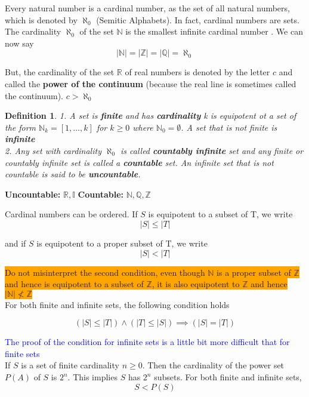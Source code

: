 \documentclass[12pt]{article}
\newcommand{\mybox}[2][black]{\colorbox{#1}{#2}}
\newcommand{\RR}{\mathbb{R}}
\newcommand{\NN}{\mathbb{N}}
\newcommand{\ZZ}{\mathbb{Z}}
\newcommand{\QQ}{\mathbb{Q}}
\newtheorem{definition}{Definition}
\begin{document}
Every natural number is a cardinal number, as the set of all natural numbers, which is denoted by $\aleph_0$ (Semitic Alphabets). In fact, cardinal numbers are sets. The cardinality $\aleph_0$ of the set $\NN$ is the smallest infinite cardinal number . We can now say 
\[|\NN|=|\ZZ|=|\QQ|= \aleph_0\]

But, the cardinality of the set $\RR$ of real numbers is denoted by the letter $c$ and called the \textbf{power of the continuum} (because the real line is sometimes called the continuum). $c > \aleph_0$

\begin{definition}
1. A set is \textbf{finite} and has \textbf{cardinality} k is equipotent ot a set of the form $ \NN_k = [{1, \ldots, k}]$ for $k \geq 0$ where $\NN_0 = \emptyset$. A set that is not finite is \textbf{infinite}\\

2. Any set with cardinality $\aleph_0$ is called \textbf{countably infinite} set and any finite or countably infinite set is called a \textbf{countable} set. An infinite set that is not countable is said to be \textbf{uncountable}.

\end{definition}


\textbf{Uncountable:} $\RR , \mathbb{I}$ \hfill
\textbf{Countable:} $\NN , \QQ, \ZZ$

Cardinal numbers can be ordered. If $S$ is equipotent to a subset of T, we write
\[ |S| \leq |T| \]

and if $S$ is equipotent to a proper subset of T, we write 
\[ |S| < |T| \]


\mybox[orange]{Do not misinterpret the second condition, even though $\NN$ is a proper subset of $\ZZ$}\\ \mybox[orange]{and hence is equipotent to a subset of $\ZZ$, it is also equipotent to $\ZZ$ and hence $|\NN| \not< \ZZ$}\\

For both finite and infinite sets, the following condition holds

\[ (|S| \leq |T|) \land (|T| \leq |S|) \implies (|S| = |T|) \]
 
\textcolor{blue}{The proof of the condition for infinite sets is a little bit more difficult that for finite sets}\\


If $S$ is a set of finite cardinality $n\geq 0$. Then the cardinality of the power set $P(A)$ of $S$ is $2^n$. This implies $S$ has $2^n$ subsets. For both finite and infinite sets, 
\[S < P(S)\]
\end{document}
